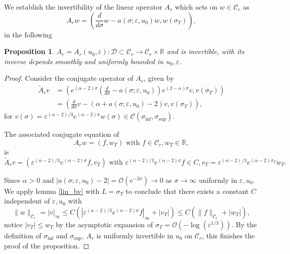 \documentclass[letterpaper,11pt]{article}
\newcommand{\rmO}{\mathcal{O}}
\newcommand{\eps}{\varepsilon}
\numberwithin{equation}{section}
\theoremstyle{plain}
\newtheorem{proposition}[theorem]{Proposition}
\begin{document}
We establish the invertibility of the linear operator $A_r$ which acts on $w \in \mathcal{C}_r$ as 
\[
A_r w = \left( \frac{d}{d\sigma}w-a(\sigma;\eps, u_0) w,  w(\sigma_T)\right),
\]
in the following
\begin{proposition}\label{inv_A_r}
$A_r=A_r(u_0,\eps) : \mathcal{D}\subset \mathcal{C}_r \to \mathcal{C}_r\times \mathbb{R}$ and is invertible, with its inverse  depends smoothly and uniformly bounded in $u_0, \eps$. 
\end{proposition}
\begin{proof}
Consider the conjugate operator of $A_r$, given by
\begin{align*}
\tilde{A}_r v &= \left( e^{(\alpha-2)\sigma}\left(\frac{d}{d\sigma}-a(\sigma;\eps,u_0)\right)e^{(2-\alpha)\sigma} v, v(\sigma_T) \right) \\
&= \left( \frac{d}{d\sigma}v -(\alpha+a(\sigma;\eps,u_0)-2)v, v(\sigma_T) \right),
\end{align*}
for $v(\sigma)=\eps^{(\alpha-2)/3}e^{(\alpha-2)\sigma}w(\sigma) \in \mathcal{C}(\sigma_{\inf}, \sigma_{\sup})$. 

The associated conjugate equation of 
\[
A_r w = (f,w_T) \text{ with } f \in \mathcal{C}_r, w_T \in \mathbb{R},
\] is 
\[
\tilde{A}_r v = (\eps^{(\alpha-2)/3}e^{(\alpha-2)\sigma} f,v_T) \text{ with } \eps^{(\alpha-2)/3}e^{(\alpha-2)\sigma} f \in C , v_T = \eps^{(\alpha-2)/3} e^{(\alpha-2)\sigma_T}w_T.
\]
 
Since $\alpha > 0$ and $|a(\sigma;\eps,u_0) -2| = \rmO(e^{-2\sigma}) \to 0$ as $\sigma \to \infty$ uniformly in $\eps, u_0$. We apply lemma \ref{lin_bv} with $L= \sigma_T$ to conclude that there exists a constant $C$ independent of $\eps, u_0$ with 
\[
\|w\|_{\mathcal{C}_r} = |v|_\infty \le C(|\eps^{(\alpha-2)/3}e^{(\alpha-2)\sigma} f |_{\infty}+|v_T|) \le C(\|f\|_{\mathcal{C}_r}+|w_T|),
\]
notice $|v_T| \le w_T$ by the asymptotic expansion of $\sigma_T  = \rmO(-\log(\eps^{1/3}))$. By the definition of $\sigma_{\inf}$ and $\sigma_{\sup}$, $A_r$ is uniformly invertible in $u_0$ on $\mathcal{C}_r$, this finishes the proof of the proposition.
\end{proof}
\end{document}
